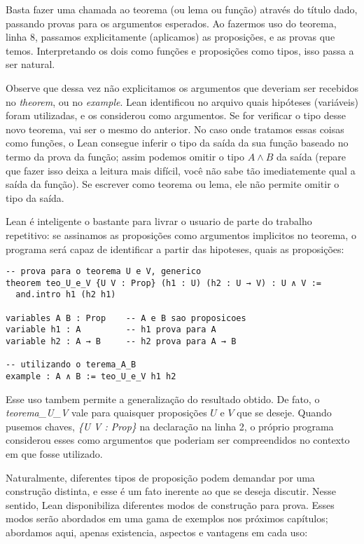 \noindent Basta fazer uma chamada ao teorema (ou lema ou função) através do título dado, passando provas para os argumentos esperados. Ao fazermos uso do teorema, linha 8, passamos explicitamente (aplicamos) as proposições, e as provas que temos.
Interpretando os dois como funções e proposições como tipos, isso passa a ser natural.

Observe que dessa vez não explicitamos os argumentos que deveriam ser recebidos no \textit{theorem}, ou no \textit{example}. Lean identificou no arquivo quais hipóteses (variáveis) foram utilizadas, e os considerou como argumentos. Se for verificar o tipo desse novo teorema, vai ser o mesmo do anterior. No caso onde tratamos essas coisas como funções, o Lean consegue inferir o tipo da saída da sua função baseado no termo da prova da função; assim podemos omitir o tipo $A ∧ B$ da saída (repare que fazer isso deixa a leitura mais difícil, você não sabe tão imediatemente qual a saída da função). Se escrever como teorema ou lema, ele não permite omitir o tipo da saída. 

Lean é inteligente o bastante para livrar o usuario de parte do trabalho repetitivo: se assinamos as proposições como argumentos implicitos no teorema, o programa será capaz de identificar a partir das hipoteses, quais as proposições:

\vspace{5mm}
\begin{lstlisting}
-- prova para o teorema U e V, generico
theorem teo_U_e_V {U V : Prop} (h1 : U) (h2 : U → V) : U ∧ V :=
  and.intro h1 (h2 h1)

variables A B : Prop    -- A e B sao proposicoes
variable h1 : A         -- h1 prova para A
variable h2 : A → B     -- h2 prova para A → B

-- utilizando o terema_A_B
example : A ∧ B := teo_U_e_V h1 h2
\end{lstlisting}
\vspace{5mm}

\noindent Esse uso tambem permite a generalização do resultado obtido. De fato, o \textit{teorema\_U\_V} vale para quaisquer proposições $U$ e $V$ que se deseje. Quando pusemos chaves, \textit{\{U V : Prop\}} na declaração na linha 2, o próprio programa considerou esses como argumentos que poderiam ser compreendidos no contexto em que fosse utilizado.

\vspace{5mm}

Naturalmente, diferentes tipos de proposição podem demandar por uma construção distinta, e esse é um fato inerente ao que se deseja discutir. Nesse sentido, Lean disponibiliza diferentes modos de construção para prova. Esses modos serão abordados em uma gama de exemplos nos próximos capítulos; abordamos aqui, apenas existencia, aspectos e vantagens em cada uso:

